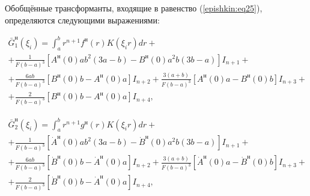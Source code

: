 Обобщённые трансформанты, входящие в равенство (\ref{epishkin:eq25}), определяются следующими выражениями:

\begin{multline}

\label{epishkin:eq37}

 \bar  G_1^{\text{н}}  (\xi _i )=\int_a^b r^{n+1}f^{\text{н}}(r)K(\xi _i r)dr+

 \\

 +

\frac{1}{F(b-a)^3} \left[A^{\text{н}}(0)  a  b^2(3a-b)-B^{\text{н}}(0)  a^2  b(3b-a) \right]  I_{n+1} + \\ 

 +\frac{6ab}{F(b-a)^3}\left[ B^{\text{н}}(0)  b-A^{\text{н}}(0)  a \right]  

I_{n+2} +\frac{3(a+b)}{F(b-a)^3}\left[ {A^{\text{н}}(0)  a-B^{\text{н}}(0)  b} 

\right]  I_{n+3} + \\ 

 +\frac{2}{F(b-a)^3}\left[ B^{\text{н}}(0)  b-A^{\text{н}}(0)  a \right]  

I_{n+4} , 

\end{multline}

\begin{multline}

\label{epishkin:eq38}

 \bar  G_2^{\text{н}}  (\xi _i )=\int_a^b r^{n+1}g^{\text{н}}(r)K(\xi _i r)dr+

\\

+ 

 \frac{1}{F(b-a)^3}\left[ \dot {A}^{\text{н}}(0)  a  b^2(3a-b)-\dot {B}^{\text{н}}(0)  a^2  b(3b-a) \right]  I_{n+1} + \\ 

 +\frac{6ab}{F(b-a)^3}\left[ \dot {B}^{\text{н}}(0)  b-\dot {A}^{\text{н}}(0)  a

\right]  I_{n+2} +\frac{3(a+b)}{F(b-a)^3}\left[ \dot {A}^{\text{н}}(0)  

a-\dot {B}^{\text{н}}(0)  b \right]  I_{n+3} + \\ 

 +\frac{2}{F(b-a)^3}\left[ \dot {B}^{\text{н}}(0)  b-\dot {A}^{\text{н}}(0)  a \right]  I_{n+4} , 

\end{multline}

